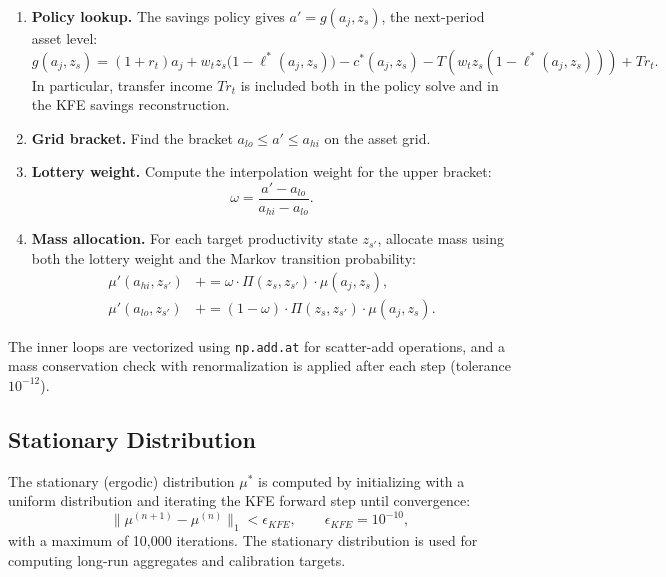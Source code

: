 \documentclass[12pt]{article}
\begin{document}
\begin{enumerate}
  \item \textbf{Policy lookup.} The savings policy gives $a' = g(a_j, z_s)$, the next-period asset level:
  \begin{equation}\label{eq:kfe_policy_savings}
    g(a_j, z_s) = (1+r_t) a_j + w_t z_s \bigl(1-\ell^*(a_j,z_s)\bigr) - c^*(a_j,z_s) - T\!\left(w_t z_s (1-\ell^*(a_j,z_s))\right) + Tr_t.
  \end{equation}
  In particular, transfer income $Tr_t$ is included both in the policy solve and in the KFE savings reconstruction.
  \item \textbf{Grid bracket.} Find the bracket $a_{lo} \leq a' \leq a_{hi}$ on the asset grid.
  \item \textbf{Lottery weight.} Compute the interpolation weight for the upper bracket:
  \begin{equation}\label{eq:lottery_weight}
    \omega = \frac{a' - a_{lo}}{a_{hi} - a_{lo}}.
  \end{equation}
  \item \textbf{Mass allocation.} For each target productivity state $z_{s'}$, allocate mass using both the lottery weight and the Markov transition probability:
  \begin{align}
    \mu'(a_{hi}, z_{s'}) &\mathrel{+}= \omega \cdot \Pi(z_s, z_{s'}) \cdot \mu(a_j, z_s), \label{eq:kfe_hi} \\
    \mu'(a_{lo}, z_{s'}) &\mathrel{+}= (1 - \omega) \cdot \Pi(z_s, z_{s'}) \cdot \mu(a_j, z_s). \label{eq:kfe_lo}
  \end{align}
\end{enumerate}

The inner loops are vectorized using \texttt{np.add.at} for scatter-add operations, and a mass conservation check with renormalization is applied after each step (tolerance $10^{-12}$).

\subsection{Stationary Distribution}

The stationary (ergodic) distribution $\mu^*$ is computed by initializing with a uniform distribution and iterating the KFE forward step until convergence:
\begin{equation}\label{eq:kfe_convergence}
  \|\mu^{(n+1)} - \mu^{(n)}\|_1 < \epsilon_{KFE}, \qquad \epsilon_{KFE} = 10^{-10},
\end{equation}
with a maximum of 10{,}000 iterations. The stationary distribution is used for computing long-run aggregates and calibration targets.
\end{document}

